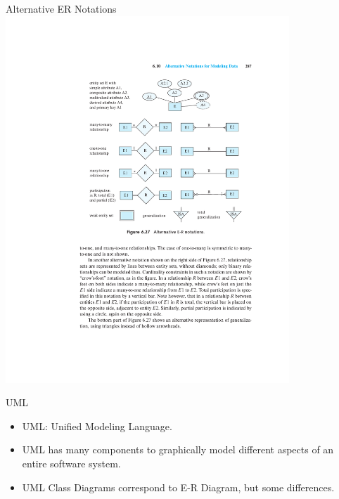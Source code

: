 \documentclass{beamer}
\begin{document}
\begin{frame}{Alternative ER Notations}
    \centering
    \includegraphics[trim={6.25cm 12cm 3.63cm 4.6cm}, clip, width=0.8\textwidth]{figures/alternative_notations}
\end{frame}

\begin{frame}{UML}
    \begin{itemize}
        \item UML: Unified Modeling Language.
        \item UML has many components to graphically model different aspects of an entire software system.
        \item UML Class Diagrams correspond to E-R Diagram, but some differences.
    \end{itemize}
\end{frame}
\end{document}
